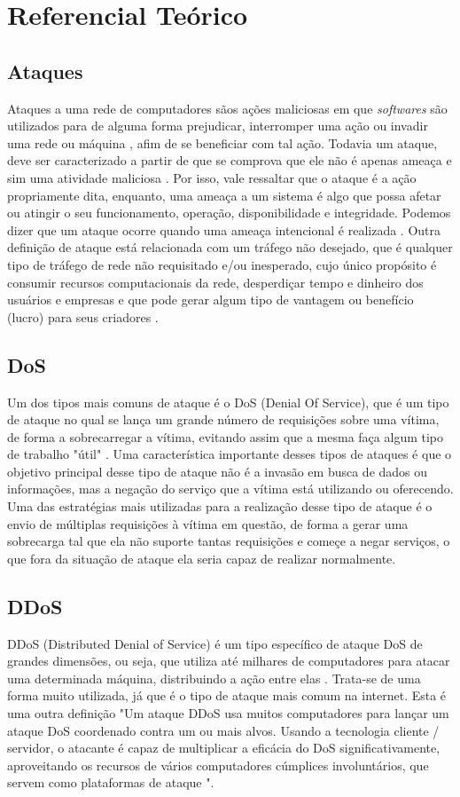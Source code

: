 \chapter{Referencial Teórico}
\label{CAP2}
\section{Ataques}
Ataques a uma rede de computadores sãos ações maliciosas em que \textit{softwares} são utilizados para de alguma forma prejudicar, interromper uma ação ou invadir uma rede ou máquina , afim de se beneficiar com tal ação. Todavia um ataque, deve ser caracterizado a partir de que se comprova que ele não é apenas ameaça e sim uma atividade maliciosa . Por isso, vale ressaltar que o ataque é a ação propriamente dita, enquanto, uma ameaça a um sistema é algo que possa afetar ou atingir o seu funcionamento, operação, disponibilidade e integridade. Podemos dizer que um ataque ocorre quando uma ameaça intencional é realizada \cite{dos2017ameaccas}.  Outra definição de ataque está relacionada com um tráfego não desejado, que é qualquer tipo de tráfego de rede não requisitado e/ou inesperado, cujo único propósito é consumir recursos computacionais da rede, desperdiçar tempo e dinheiro dos usuários e empresas e que pode gerar algum tipo de vantagem ou benefício (lucro) para seus criadores \cite{feitosa2008trafego}. 
\section{DoS}
Um dos tipos mais comuns de ataque é o DoS (Denial Of Service), que  é um tipo de ataque no qual se lança um grande número de requisições sobre uma vítima, de forma a sobrecarregar a vítima, evitando assim que a mesma faça algum tipo de trabalho "útil" \cite{handley2006internet}. Uma característica importante desses tipos de ataques é que o objetivo principal desse tipo de ataque não é a invasão em busca de dados ou informações, mas a negação do serviço que a vítima está utilizando ou oferecendo.  Uma das estratégias mais utilizadas para a realização desse tipo de ataque é o envio de múltiplas requisições à vítima em questão, de forma a gerar uma sobrecarga tal que ela não suporte tantas requisições e começe a negar serviços, o que fora da situação de ataque ela seria capaz de realizar normalmente\cite{mandia2001hackers}.

\section{DDoS}
DDoS (Distributed Denial of Service) é um tipo específico de ataque DoS de grandes dimensões, ou seja, que utiliza até milhares de computadores para atacar uma determinada máquina, distribuindo a ação entre elas \cite{alecrim2008ataques}. Trata-se de uma forma muito utilizada, já que é o tipo de ataque mais comum na internet. Esta é uma outra definição\: "Um ataque DDoS usa muitos computadores para lançar um ataque DoS coordenado contra um ou mais alvos. Usando a tecnologia cliente / servidor, o atacante é capaz de multiplicar a eficácia do DoS significativamente, aproveitando os recursos de vários computadores cúmplices involuntários, que servem como plataformas de ataque "\cite{stein2002world}.

